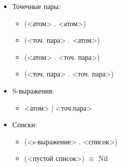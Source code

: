 \begin{enumerate}
\begin{itemize}
\begin{itemize}
      \end{itemize}
      \item Точечные пары:
      \begin{itemize}
      	   \item (<атом> . <атом>)
	   \item (<точ. пара> . <атом>)
	   \item (<атом> . <точ. пара>)
	   \item (<точ. пара> . <точ. пара>)
      \end{itemize}
      \item S-выражения:
      \begin{itemize}
      	   \item <атом> | <точ.пара>
      \end{itemize}
      \item Списки:
      \begin{itemize}
      	   \item (<s-выражение> . <список>)
	   \item (<пустой список>) $\equiv$ Nil
      \end{itemize}
    \end{itemize}
\end{enumerate}

